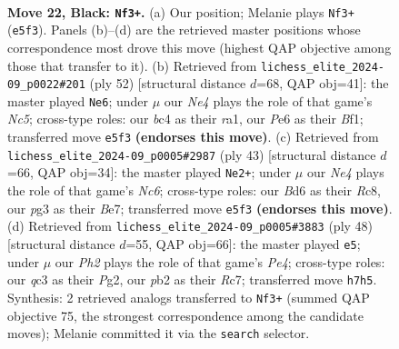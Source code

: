 \documentclass[11pt]{article}
\begin{document}
\clearpage

\begin{figure}[p]\centering
\begin{subfigure}{0.46\textwidth}\centering
\resizebox{\linewidth}{!}{%
\newchessgame
\chessboard[
  setfen={4r1k1/pp5p/3bpqp1/4n3/2B5/2Q3P1/PP3P1P/R3R1K1 b - - 0 22},
  showmover=false,
  pgfstyle=straightmove, color=movearrow, markmove={e5-f3}
]}
\caption{}
\end{subfigure}\hfill
\begin{subfigure}{0.46\textwidth}\centering
\resizebox{\linewidth}{!}{%
\newchessgame
\chessboard[
  setfen={3r2k1/6pp/1b1q1p2/2Np4/1P2pPQP/4B3/6PK/r4B1R w - - 0 27},
  showmover=false,
  pgfstyle=straightmove, color=movearrow, markmove={c5-e6}
]}
\caption{}
\end{subfigure}
\\[4pt]
\begin{subfigure}{0.46\textwidth}\centering
\resizebox{\linewidth}{!}{%
\newchessgame
\chessboard[
  setfen={2r3k1/1p2b1p1/p2p4/q3pr2/P5Q1/R1n4P/2PB1PP1/5RK1 b - - 1 22},
  showmover=false,
  pgfstyle=straightmove, color=movearrow, markmove={c3-e2}
]}
\caption{}
\end{subfigure}\hfill
\begin{subfigure}{0.46\textwidth}\centering
\resizebox{\linewidth}{!}{%
\newchessgame
\chessboard[
  setfen={r2rq1k1/2R2p1p/p5p1/1p6/3bP3/5N1P/P1Q2PP1/4R1K1 w - - 4 25},
  showmover=false,
  pgfstyle=straightmove, color=movearrow, markmove={e4-e5}
]}
\caption{}
\end{subfigure}
\caption{\textbf{Move 22, Black: \texttt{Nf3+}.} (a) Our position; Melanie plays \texttt{Nf3+} (\texttt{e5f3}). Panels (b)--(d) are the retrieved master positions whose correspondence most drove this move (highest QAP objective among those that transfer to it). (b) Retrieved from \texttt{lichess\_elite\_2024-09\_p0022\#201} (ply 52) [structural distance $d$=68, QAP obj=41]: the master played \texttt{Ne6}; under $\mu$ our \emph{Ne4} plays the role of that game's \emph{Nc5}; cross-type roles: our \emph{b}c4 as their \emph{r}a1, our \emph{P}e6 as their \emph{B}f1; transferred move \texttt{e5f3} \textbf{(endorses this move)}. (c) Retrieved from \texttt{lichess\_elite\_2024-09\_p0005\#2987} (ply 43) [structural distance $d$=66, QAP obj=34]: the master played \texttt{Ne2+}; under $\mu$ our \emph{Ne4} plays the role of that game's \emph{Nc6}; cross-type roles: our \emph{B}d6 as their \emph{R}c8, our \emph{p}g3 as their \emph{B}e7; transferred move \texttt{e5f3} \textbf{(endorses this move)}. (d) Retrieved from \texttt{lichess\_elite\_2024-09\_p0005\#3883} (ply 48) [structural distance $d$=55, QAP obj=66]: the master played \texttt{e5}; under $\mu$ our \emph{Ph2} plays the role of that game's \emph{Pe4}; cross-type roles: our \emph{q}c3 as their \emph{P}g2, our \emph{p}b2 as their \emph{R}c7; transferred move \texttt{h7h5}. Synthesis: 2 retrieved analogs transferred to \texttt{Nf3+} (summed QAP objective 75, the strongest correspondence among the candidate moves); Melanie committed it via the \texttt{search} selector.}
\label{fig:thought-m43}
\end{figure}
\end{document}
